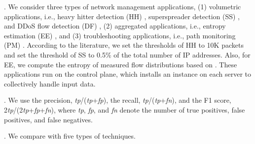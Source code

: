 . We consider three types of network management applications, (1) volumetric applications, i.e., heavy hitter detection (HH) \cite{huang2017sketchvisor}, superspreader detection (SS) \cite{tang2019mv}, and DDoS flow detection (DF) \cite{liu2021jaqen}, (2) aggregated applications, i.e., entropy estimation (EE) \cite{liu2016one}, and (3) troubleshooting applications, i.e., path monitoring (PM) \cite{ben2020pint,sheng2021deltaint}. 
According to the literature, we set the thresholds of HH to 10K packets and set the threshold of SS to 0.5\% of the total number of IP addresses. Also, for EE, we compute the entropy of measured flow distributions based on \cite{liu2016one}. These applications run on the control plane, which installs an instance on each server to collectively handle input data. 

. We use the precision, \emph{tp}/(\emph{tp}+\emph{fp}), the recall, \emph{tp}/(\emph{tp}+\emph{fn}), and the F1 score, 2\emph{tp}/(2\emph{tp}+\emph{fp}+\emph{fn}), where \emph{tp}, \emph{fp}, and \emph{fn} denote the number of true positives, false positives, and false negatives. 


. We compare \sysname with five types of techniques. 

